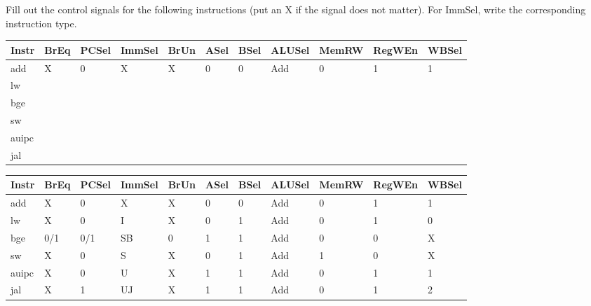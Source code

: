 \begin{blocksection}
\question
Fill out the control signals for the following instructions (put an X if the signal does not matter).  For ImmSel, write the corresponding instruction type.

\begin{tabular}{ |l|l|l|l|l|l|l|l|l|l|l| } 
 \hline
 Instr & BrEq & PCSel & ImmSel & BrUn & ASel & BSel & ALUSel & MemRW & RegWEn & WBSel \\ 
 \hline
 add & X & 0 & X & X & 0 & 0 & Add & 0 & 1 & 1 \\ 
 \hline
 lw & & & & & & & & & & \\ 
 \hline 
 bge & & & & & & & & & & \\ 
 \hline
 sw & & & & & & & & & & \\ 
 \hline 
 auipc & & & & & & & & & & \\ 
 \hline
 jal & & & & & & & & & & \\ 
 \hline
\end{tabular}

\begin{solution}[0.5in]
 \begin{tabular}{ |l|l|l|l|l|l|l|l|l|l|l| } 
 \hline
 Instr & BrEq & PCSel & ImmSel & BrUn & ASel & BSel & ALUSel & MemRW & RegWEn & WBSel \\ 
 \hline
 add & X & 0 & X & X & 0 & 0 & Add & 0 & 1 & 1 \\
 \hline
 lw & X & 0 & I & X & 0 & 1 & Add & 0 & 1 & 0 \\ 
 \hline 
 bge & 0/1 & 0/1 & SB & 0 & 1 & 1 & Add & 0 & 0 & X \\ 
 \hline
 sw & X & 0 & S & X & 0 & 1 & Add & 1 & 0 & X \\ 
 \hline 
 auipc & X & 0 & U & X & 1 & 1 & Add & 0 & 1 & 1\\ 
 \hline
 jal & X & 1 & UJ & X & 1 & 1 & Add & 0 & 1 & 2 \\ 
 \hline
\end{tabular}

\end{solution}

\end{blocksection}